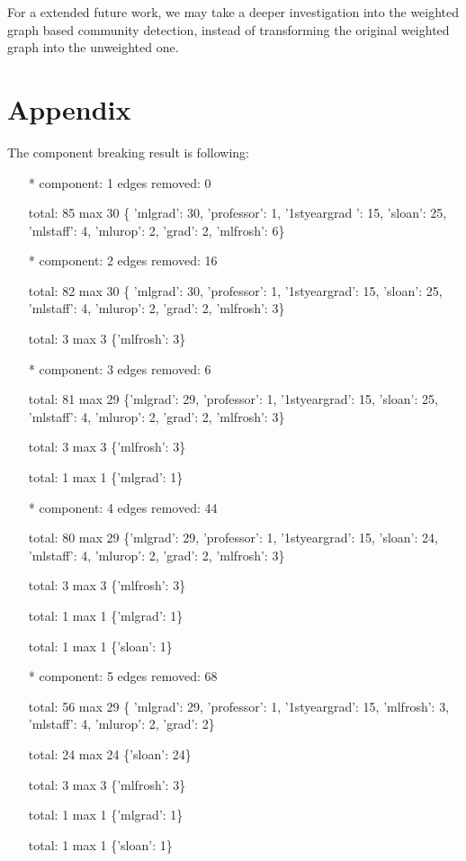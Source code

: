 \documentclass[11pt]{article}
\begin{document}
For a extended future work, we may take a deeper investigation into the weighted graph based community detection, instead of transforming the original weighted graph into the unweighted one.
\section{Appendix}\label{appendix}
The component breaking result is following:
\begin{itemize}
\item[*]
component: 1 edges removed: 0

total: 85 max 30
\{ 'mlgrad': 30, 'professor': 1, '1styeargrad ': 15,  'sloan': 25, 'mlstaff': 4, 'mlurop': 2, 'grad': 2, 'mlfrosh': 6\}

\item[*]
component: 2 edges removed: 16

total: 82 max 30
\{ 'mlgrad': 30, 'professor': 1, '1styeargrad': 15,  'sloan': 25, 'mlstaff': 4, 'mlurop': 2, 'grad': 2, 'mlfrosh': 3\}

total: 3 max 3
\{'mlfrosh': 3\}

\item[*]
component: 3 edges removed: 6

total: 81 max 29
\{'mlgrad': 29, 'professor': 1, '1styeargrad': 15, 'sloan': 25, 'mlstaff': 4, 'mlurop': 2, 'grad': 2, 'mlfrosh': 3\}

total: 3 max 3
\{'mlfrosh': 3\}

total: 1 max 1
\{'mlgrad': 1\}

\item[*]
component: 4 edges removed: 44

total: 80 max 29
\{'mlgrad': 29, 'professor': 1, '1styeargrad': 15, 'sloan': 24, 'mlstaff': 4, 'mlurop': 2, 'grad': 2, 'mlfrosh': 3\}

total: 3 max 3
\{'mlfrosh': 3\}

total: 1 max 1
\{'mlgrad': 1\}

total: 1 max 1
\{'sloan': 1\}

\item[*]
component: 5 edges removed: 68

total: 56 max 29
\{ 'mlgrad': 29, 'professor': 1, '1styeargrad': 15, 'mlfrosh': 3, 'mlstaff': 4, 'mlurop': 2, 'grad': 2\}

total: 24 max 24
\{'sloan': 24\}

total: 3 max 3
\{'mlfrosh': 3\}

total: 1 max 1
\{'mlgrad': 1\}

total: 1 max 1
\{'sloan': 1\}
\end{itemize}

%

\end{document}
